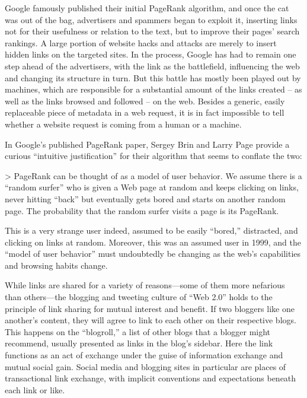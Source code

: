 Google famously published their initial PageRank algorithm, and once the cat was out of the bag, advertisers and spammers began to exploit it, inserting links not for their usefulness or relation to the text, but to improve their pages' search rankings. A large portion of website hacks and attacks are merely to insert hidden links on the targeted sites. In the process, Google has had to remain one step ahead of the advertisers, with the link as the battlefield, influencing the web and changing its structure in turn. But this battle has mostly been played out by machines, which are responsible for a substantial amount of the links created – as well as the links browsed and followed – on the web. Besides a generic, easily replaceable piece of metadata in a web request, it is in fact impossible to tell whether a website request is coming from a human or a machine.

In Google's published PageRank paper, Sergey Brin and Larry Page provide a curious ``intuitive justification'' for their algorithm that seems to conflate the two:

> PageRank can be thought of as a model of user behavior. We assume there is a ``random surfer'' who is given a Web page at random and keeps clicking on links, never hitting ``back'' but eventually gets bored and starts on another random page. The probability that the random surfer visits a page is its PageRank. 

\noindent This is a very strange user indeed, assumed to be easily ``bored,'' distracted, and clicking on links at random. Moreover, this was an assumed user in 1999, and the ``model of user behavior'' must undoubtedly be changing as the web's capabilities and browsing habits change.

While links are shared for a variety of reasons---some of them more nefarious than others---the blogging and tweeting culture of ``Web 2.0'' holds to the principle of link sharing for mutual interest and benefit. If two bloggers like one another's content, they will agree to link to each other on their respective blogs. This happens on the ``blogroll,'' a list of other blogs that a blogger might recommend, usually presented as links in the blog's sidebar. Here the link functions as an act of exchange under the guise of information exchange and mutual social gain. Social media and blogging sites in particular are places of transactional link exchange, with implicit conventions and expectations beneath each link or like.


